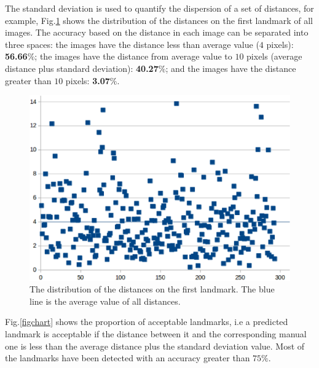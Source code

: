 \documentclass[conference]{IEEEtran}
\begin{document}
The standard deviation \cite{bland1996statistics} is used to quantify the dispersion of a set of distances, for example, Fig.\ref{figchartlm1} shows the distribution of the distances on the first landmark of all images. The accuracy based on the distance in each image can be separated into three spaces: the images have the distance less than average value ($4$ pixels): \textbf{56.66$\%$}; the images have the distance from average value to $10$ pixels (average distance plus standard deviation): \textbf{40.27$\%$}; and the images have the distance greater than $10$ pixels: \textbf{3.07$\%$}. 

\begin{figure}[htbp]
	\centerline{\includegraphics[scale=0.3]{images/statistic.eps}}
	\caption{The distribution of the distances on the first landmark. The blue line is the average value of all distances.}
	\label{figchartlm1}
\end{figure}

Fig.\ref{figchart} shows the proportion of acceptable landmarks, i.e a predicted landmark is acceptable if the distance between it and the corresponding manual one is less than the average distance plus the standard deviation  value. Most of the landmarks have been detected with an accuracy greater than $75\%$. %
\end{document}
